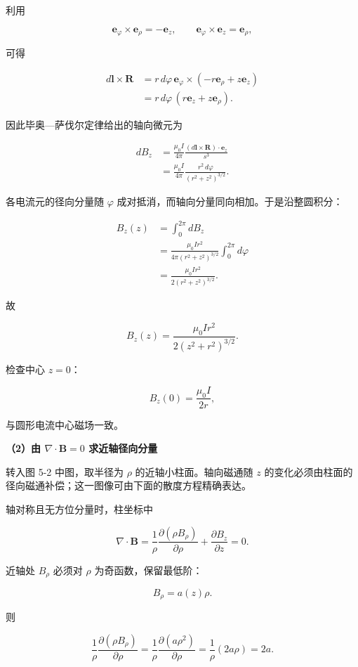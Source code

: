 \documentclass[12pt,a4paper,UTF8]{ctexart}
\begin{document}
利用

\[
\bm e_\varphi\times\bm e_\rho=-\bm e_z,
\qquad
\bm e_\varphi\times\bm e_z=\bm e_\rho,
\]

可得

\[
\begin{aligned}
d\bm l\times\bm R
&=r\,d\varphi\,\bm e_\varphi
\times(-r\bm e_\rho+z\bm e_z)\\
&=r\,d\varphi\,(r\bm e_z+z\bm e_\rho).
\end{aligned}
\]

因此毕奥---萨伐尔定律给出的轴向微元为

\[
\begin{aligned}
dB_z
&=\frac{\mu_0I}{4\pi}
\frac{(d\bm l\times\bm R)\cdot\bm e_z}{s^3}\\
&=\frac{\mu_0I}{4\pi}
\frac{r^2\,d\varphi}{(r^2+z^2)^{3/2}}.
\end{aligned}
\]

各电流元的径向分量随 \(\varphi\)
成对抵消，而轴向分量同向相加。于是沿整圆积分：

\[
\begin{aligned}
B_z(z)
&=\int_0^{2\pi}dB_z\\
&=\frac{\mu_0Ir^2}{4\pi(r^2+z^2)^{3/2}}
\int_0^{2\pi}d\varphi\\
&=\frac{\mu_0Ir^2}{2(r^2+z^2)^{3/2}}.
\end{aligned}
\]

故

\[
\boxed{
B_z(z)=\frac{\mu_0Ir^2}{2(z^2+r^2)^{3/2}}
}.
\]

检查中心 \(z=0\)：

\[
B_z(0)=\frac{\mu_0I}{2r},
\]

与圆形电流中心磁场一致。

\textbf{（2）由 \(\nabla\cdot\bm B=0\) 求近轴径向分量}

转入图 5-2 中图，取半径为 \(\rho\) 的近轴小柱面。轴向磁通随 \(z\)
的变化必须由柱面的径向磁通补偿；这一图像可由下面的散度方程精确表达。

轴对称且无方位分量时，柱坐标中

\[
\nabla\cdot\bm B
=\frac1\rho\frac{\partial(\rho B_\rho)}{\partial\rho}
+\frac{\partial B_z}{\partial z}=0.
\]

近轴处 \(B_\rho\) 必须对 \(\rho\) 为奇函数，保留最低阶：

\[
B_\rho=a(z)\rho.
\]

则

\[
\frac1\rho\frac{\partial(\rho B_\rho)}{\partial\rho}
=\frac1\rho\frac{\partial(a\rho^2)}{\partial\rho}
=\frac1\rho(2a\rho)
=2a.
\]
\end{document}
